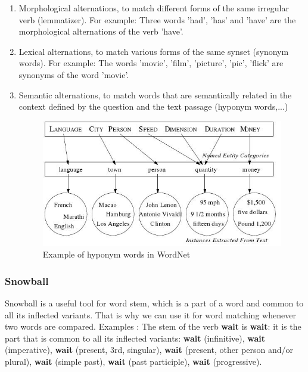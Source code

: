 \documentclass[12pt, a4paper]{report}
\begin{document}
\begin{enumerate}
 \item {Morphological alternations, to match different forms of the same irregular verb (lemmatizer). For example:   Three words 'had', 'has' and 'have' are the morphological alternations of the verb 'have'.  }
 \item {Lexical alternations, to match various forms of the same synset (synonym words). For example: The words 'movie', 'film', 'picture', 'pic', 'flick' are synonyms of the word 'movie'. }
 \item {Semantic alternations, to match words that are semantically related in the context defined by the question and the text passage (hyponym words,...)}
\begin{figure}[htbp]
\centering
\includegraphics[height=6 cm]{wordnet_hyponyms.jpg}
\caption{Example of hyponym words in WordNet}\label{fig0}
\end{figure}
\end{enumerate}

\subsubsection{Snowball}
Snowball is a useful tool for word stem, which is a part of a word and common to all its inflected variants. That is why we can use it for word matching whenever two words are compared.
Examples :
The stem of the verb \textbf{wait} is \textbf{wait}: it is the part that is common to all its inflected variants: \textbf{wait} (infinitive), \textbf{wait} (imperative), \textbf{wait} (present, 3rd, singular), \textbf{wait} (present, other person and/or plural), \textbf{wait} (simple past), \textbf{wait} (past participle), \textbf{wait} (progressive).


\newpage
\end{document}
